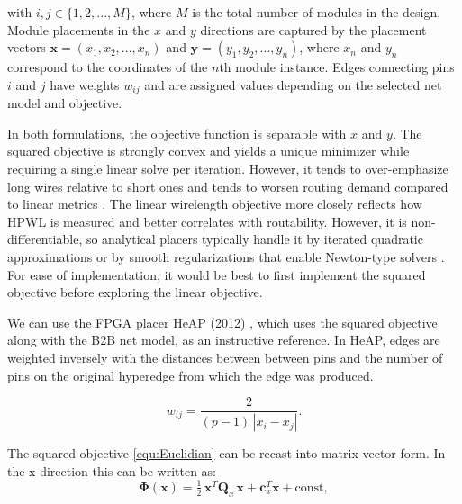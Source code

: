 with $i, j \in \{1, 2, ..., M\}$, where $M$ is the total number of modules in the design.
Module placements in the $x$ and $y$ directions are captured by the placement vectors \( \boldsymbol{x} = (x_1, x_2, ..., x_n) \) and \( \boldsymbol{y} = (y_1, y_2, ..., y_n) \), where $x_n$ and $y_n$ correspond to the coordinates of the $n$th module instance.
Edges connecting pins $i$ and $j$ have weights $w_{ij}$ and are assigned values depending on the selected net model and objective.

In both formulations, the objective function is separable with $x$ and $y$.
The squared objective is strongly convex and yields a unique minimizer while requiring a single linear solve per iteration. 
However, it tends to over-emphasize long wires relative to short ones and tends to worsen routing demand compared to linear metrics \cite{AP_2000}. 
The linear wirelength objective more closely reflects how HPWL is measured and better correlates with routability. 
However, it is non-differentiable, so analytical placers typically handle it by iterated quadratic approximations or by smooth regularizations that enable Newton-type solvers \cite{AP_2000}. 
For ease of implementation, it would be best to first implement the squared objective before exploring the linear objective.

We can use the FPGA placer HeAP (2012) \cite{AP_2012}, which uses the squared objective along with the B2B net model, as an instructive reference.
In HeAP, edges are weighted inversely with the distances between between pins and the number of pins on the original hyperedge from which the edge was produced.

\begin{equation}
    w_{ij} = \frac{2}{(p-1)\,|x_i - x_j|}.
    \label{equ:weight_linearized}
\end{equation}


The squared objective \ref{equ:Euclidian} can be recast into matrix-vector form.
In the x-direction this can be written as:
\begin{equation}
    \boldsymbol{\Phi} (\boldsymbol{x}) 
    = \tfrac{1}{2}\,\boldsymbol{x}^T \boldsymbol{Q}_x\,\boldsymbol{x} + \boldsymbol{c}_x^T \boldsymbol{x} + \text{const},
    \label{equ:quadratic}
\end{equation}

